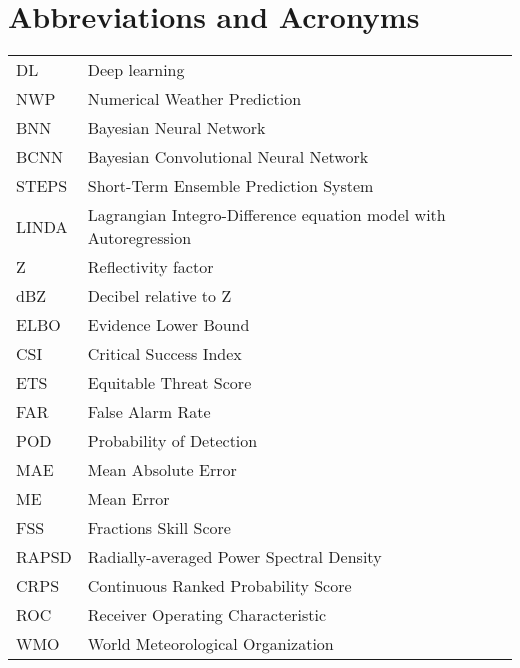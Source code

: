 \chapter*{Abbreviations and Acronyms}


\noindent
\begin{longtable}{@{}p{}p{}@{}}
DL & Deep learning \\
NWP & Numerical Weather Prediction \\
BNN & Bayesian Neural Network \\
BCNN & Bayesian Convolutional Neural Network \\
STEPS & Short-Term Ensemble Prediction System \\
LINDA & Lagrangian Integro-Difference equation model with Autoregression\\
Z & Reflectivity factor \\
dBZ & Decibel relative to Z \\
ELBO & Evidence Lower Bound \\
CSI & Critical Success Index \\
ETS & Equitable Threat Score \\
FAR & False Alarm Rate \\
POD & Probability of Detection \\
MAE & Mean Absolute Error \\
ME & Mean Error \\
FSS & Fractions Skill Score \\
RAPSD & Radially-averaged Power Spectral Density \\
CRPS & Continuous Ranked Probability Score \\
ROC & Receiver Operating Characteristic \\
WMO & World Meteorological Organization \\

 

\end{longtable}
